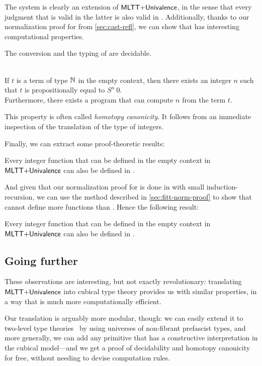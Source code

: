 The system \HoTTminus is clearly an extension of \( \mathsf{MLTT}{+}\mathsf{Univalence} \),
in the sense that every judgment that is valid in the latter is also valid in 
\HoTTminus.
% 
Additionally, thanks to our normalization proof for \SetoidCCplus from 
\cref{sec:cast-refl}, we can show that \HoTTminus has interesting computational 
properties.

\begin{theorem}
    The conversion and the typing of \HoTTminus are decidable.
\end{theorem}

\begin{theorem}
     \phantom{.}\\
    If \( t \) is a term of type \( \mathbb{N} \) in the empty context, then there 
    exists an integer \( n \) such that \( t \) is propositionally equal to 
    \( S^n~0 \). \\
    Furthermore, there exists a program that can compute \( n \) from the term \( t \).
\end{theorem}

This property is often called \emph{homotopy canonicity}. It follows from an
immediate inspection of the translation of the type of integers.

Finally, we can extract some proof-theoretic results:

\begin{theorem}
    Every integer function that can be defined in the empty context in 
    \( \mathsf{MLTT}{+}\mathsf{Univalence} \) can also be defined in \SetoidCCplus.
\end{theorem}

And given that our normalization proof for \SetoidCCplus is done in \MLTT
with small induction-recursion, we can use the method described in 
\cref{sec:fitt-norm-proof} to show that \SetoidCCplus cannot define more
functions than \MLTT. Hence the following result:

\begin{theorem}
    Every integer function that can be defined in the empty context in 
    \( \mathsf{MLTT}{+}\mathsf{Univalence} \) can also be defined in \MLTT.
\end{theorem}

\subsection{Going further}

These observations are interesting, but not exactly revolutionary: translating
\( \mathsf{MLTT}{+}\mathsf{Univalence} \) into cubical type theory provides us
with similar properties, in a way that is much more computationally efficient.

Our translation is arguably more modular, though: we can easily extend it to
two-level type theories~ 
by using universes of non-fibrant prefascist types,
and more generally, we can add any primitive that has a constructive interpretation 
in the cubical model---and we get a proof of decidability and homotopy canonicity 
for free, without needing to devise computation rules.